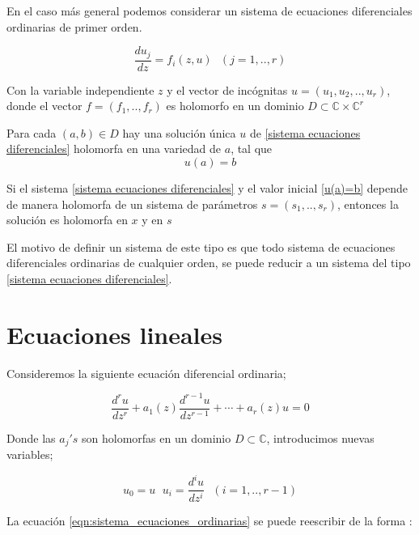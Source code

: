  En el caso m\'as general podemos considerar un sistema de ecuaciones diferenciales ordinarias de primer orden.

\begin{equation} \label{sistema ecuaciones diferenciales}
\frac{du_{j}}{dz} = f_{i}(z,u) \ \ \  (j=1,..,r)
\end{equation}

Con la variable independiente $z$ y el vector de inc\'ognitas $u=(u_{1},u_{2},..,u_{r})$, donde el vector $f=(f_{1},..,f_{r})$ es holomorfo en un dominio $D \subset \mathbb{C} \times \mathbb{C}^{r}$

\begin{thm} Para cada $(a,b) \in D $ hay una soluci\'on \'unica $u$ de \ref{sistema ecuaciones diferenciales} holomorfa en una variedad de $a$, tal que
\begin{equation} \label{u(a)=b}
 u(a)=b
\end{equation}
\end{thm}

\begin{thm} Si el sistema \ref{sistema ecuaciones diferenciales} y el valor inicial \ref{u(a)=b} depende de manera holomorfa de un sistema de par\'ametros $s=(s_{1},..,s_{r})$, entonces la soluci\'on es holomorfa en $x$ y en $s$
\end{thm}

El motivo de definir un sistema de este tipo es que todo sistema de ecuaciones diferenciales ordinarias de cualquier orden, se puede reducir a un sistema del tipo \ref{sistema ecuaciones diferenciales}.


\section{Ecuaciones lineales }

Consideremos la siguiente ecuaci\'on diferencial ordinaria;

\begin{equation}
\label{eqn:sistema_ecuaciones_ordinarias}
\frac{d^{r}u}{dz^{r}} + a_{1}(z) \frac{d^{r-1}u}{dz^{r-1}} + \cdots + a_{r}(z)u=0
\end{equation}

Donde las $a_{j}'s$ son holomorfas en un dominio $D \subset \mathbb{C}$, introducimos nuevas variables;

$$u_{0}=u \ \ \, u_{i} = \frac{d^{i}u}{dz^{i}} \ \ \ (i=1,..,r-1)$$

La ecuaci\'on \ref{eqn:sistema_ecuaciones_ordinarias} se puede reescribir de la forma :

